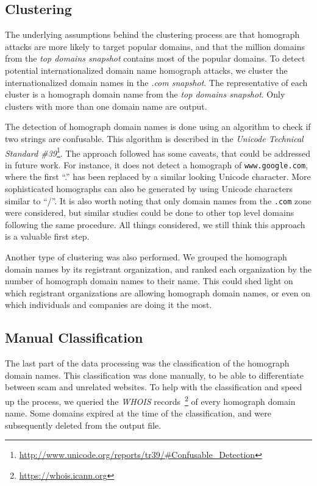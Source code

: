 \documentclass[letterpaper,twocolumn,10pt]{article}
\begin{document}
\subsection{Clustering}
The underlying assumptions behind the clustering process are that homograph attacks are more likely to target popular domains, and that the million domains from the \textit{top domains snapshot} contains most of the popular domains.
To detect potential internationalized domain name homograph attacks, we cluster the internationalized domain names in the \textit{.com snapshot}.
The representative of each cluster is a homograph domain name from the \textit{top domains snapshot}.
Only clusters with more than one domain name are output.

The detection of homograph domain names is done using an algorithm to check if two strings are confusable.
This algorithm is described in the \textit{Unicode Technical Standard \#39}\footnote{\url{http://www.unicode.org/reports/tr39/#Confusable_Detection}}.
The approach followed has some caveats, that could be addressed in future work.
For instance, it does not detect a homograph of \texttt{www.google.com}, where the first ``.'' has been replaced by a similar looking Unicode character.
More sophisticated homographs can also be generated by using Unicode characters similar to ``/''.
It is also worth noting that only domain names from the \texttt{.com} zone were considered, but similar studies could be done to other top level domains following the same procedure.
All things considered, we still think this approach is a valuable first step.

Another type of clustering was also performed.
We grouped the homograph domain names by its registrant organization, and ranked each organization by the number of homograph domain names to their name.
This could shed light on which registrant organizations are allowing homograph domain names, or even on which individuals and companies are doing it the most.

\subsection{Manual Classification}
The last part of the data processing was the classification of the homograph domain names.
This classification was done manually, to be able to differentiate between scam and unrelated websites.
To help with the classification and speed up the process, we queried the \textit{WHOIS} records~\footnote{\url{https://whois.icann.org}} of every homograph domain name.
Some domains expired at the time of the classification, and were subsequently deleted from the output file.
\end{document}
